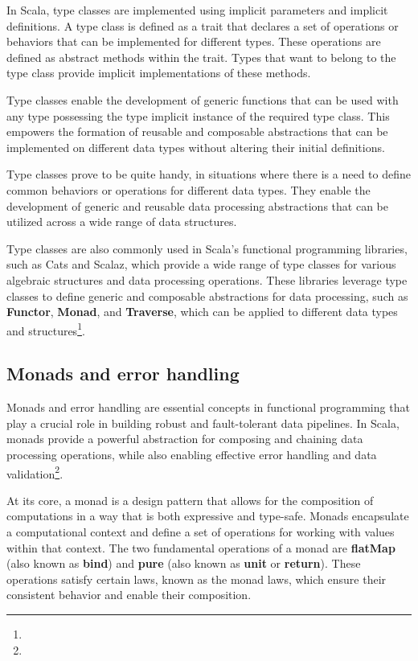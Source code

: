 In Scala, type classes are implemented using implicit parameters and implicit definitions. A type class is defined as a trait that declares a set of operations or behaviors that can be implemented for different types. These operations are defined as abstract methods within the trait. Types that want to belong to the type class provide implicit implementations of these methods\footnotemark[2].



Type classes enable the development of generic functions that can be used with any type possessing the type implicit instance of the required type class. This empowers the formation of reusable and composable abstractions that can be implemented on different data types without altering their initial definitions\footnotemark[2].



Type classes prove to be quite handy, in situations where there is a need to define common behaviors or operations for different data types. They enable the development of generic and reusable data processing abstractions that can be utilized across a wide range of data structures\footnotemark[2].



Type classes are also commonly used in Scala's functional programming libraries, such as Cats and Scalaz, which provide a wide range of type classes for various algebraic structures and data processing operations. These libraries leverage type classes to define generic and composable abstractions for data processing, such as \textbf{Functor}, \textbf{Monad}, and \textbf{Traverse}, which can be applied to different data types and structures\footnote[2]{}.

\subsection{Monads and error handling}

Monads and error handling are essential concepts in functional programming that play a crucial role in building robust and fault-tolerant data pipelines. In Scala, monads provide a powerful abstraction for composing and chaining data processing operations, while also enabling effective error handling and data validation\footnote[15]{}.

At its core, a monad is a design pattern that allows for the composition of computations in a way that is both expressive and type-safe. Monads encapsulate a computational context and define a set of operations for working with values within that context. The two fundamental operations of a monad are \textbf{flatMap} (also known as \textbf{bind}) and \textbf{pure} (also known as \textbf{unit} or \textbf{return}). These operations satisfy certain laws, known as the monad laws, which ensure their consistent behavior and enable their composition\footnotemark[15].

